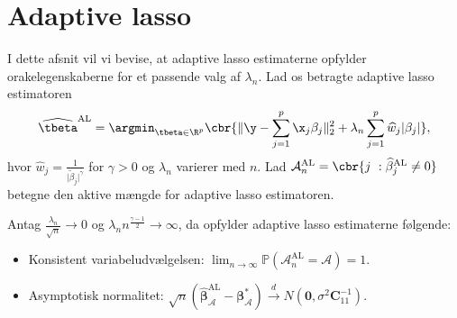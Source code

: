 \section{Adaptive lasso} \label{subsec:konsistentAL}
I dette afsnit vil vi bevise, at adaptive lasso estimaterne opfylder orakelegenskaberne for et passende valg af \(\lambda_n\). 
Lad os betragte adaptive lasso estimatoren
\begin{align*}
\widehat{\tbeta}^\text{AL} = \argmin_{\tbeta \in \R^p} \cbr{ \Vert \y - \sum_{j=1}^p \x_j \beta_j \Vert_2^2 + \lambda_n \sum_{j=1}^p \widehat{w}_j \vert \beta_j\vert},
\end{align*}
hvor \(\widehat{w}_j = \frac{1}{\vert\tilde{\beta}_j \vert^\gamma}\) for \(\gamma > 0\) og \(\lambda_n\) varierer med \(n\).
Lad \(\mathcal{A}_n^\text{AL} = \cbr{j \ : \widehat{\beta}_j^{\text{AL}} \neq 0 }\) betegne den aktive mængde for adaptive lasso estimatoren.
%
\begin{thm}\label{thm:ALoracle}
Antag $\frac{\lambda_n}{\sqrt{n}} \rightarrow 0$ og $\lambda_n n^\frac{\gamma-1}{2} \rightarrow \infty$, da opfylder adaptive lasso estimaterne følgende:
\begin{itemize}
\item Konsistent variabeludvælgelsen: $\lim_{n \rightarrow \infty} \mathbb{P}(\mathcal{A}_n^\text{AL}=\mathcal{A})=1$.
\item Asymptotisk normalitet: $\sqrt{n}\left( \widehat{\boldsymbol{\beta}}_\mathcal{A}^{\text{AL}}-\boldsymbol{\beta}_\mathcal{A}^* \right) \overset{d}{\rightarrow} N(\textbf{0},\sigma^2 \boldsymbol{C}_{11}^{-1}).$
\end{itemize} 
\end{thm}
%
